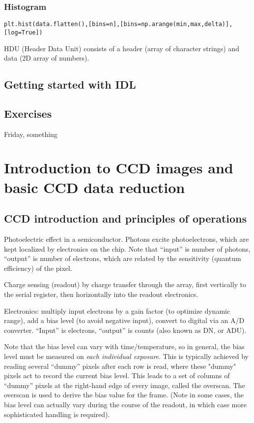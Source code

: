 \documentclass{article}
\begin{document}
\subsubsection*{Histogram}
\begin{itemize*}
    \item \verb|plt.hist(data.flatten(),[bins=n],[bins=np.arange(min,max,delta)],[log=True])|
\end{itemize*}

HDU (Header Data Unit) consists of a header (array of character strings) and
data (2D array of numbers).

\subsection*{Getting started with IDL}
\subsection*{Exercises}

\newpage\textcolor{date}{Friday, something}
\section{Introduction to CCD images and basic CCD data reduction}
\subsection*{CCD introduction and principles of operations}
Photoelectric effect in a semiconductor. Photons excite
photoelectrons, which are kept localized by electronics on the chip.
Note that ``input'' is number of photons, ``output'' is number of
electrons, which are related by the sensitivity (quantum efficiency)
of the pixel.

Charge sensing (readout) by charge transfer through the array, first
vertically to the serial register, then horizontally into the readout
electronics.

Electronics: multiply input electrons by a gain factor (to optimize
dynamic range), add a bias level (to avoid negative input), convert to
digital via an A/D converter. ``Input'' is electrons, ``output'' is counts
(also known as DN, or ADU).

Note that the bias level can vary with time/temperature, so in
general, the bias level must be measured on \emph{each individual exposure}.
This is typically achieved by reading several ``dummy'' pixels after
each row is read, where these "dummy" pixels act to record the current
bias level. This leads to a set of columns of ``dummy'' pixels at the
right-hand edge of every image, called the overscan. The overscan is
used to derive the bias value for the frame. (Note in some cases, the
bias level can actually vary during the course of the readout, in
which case more sophisticated handling is required).
\end{document}
